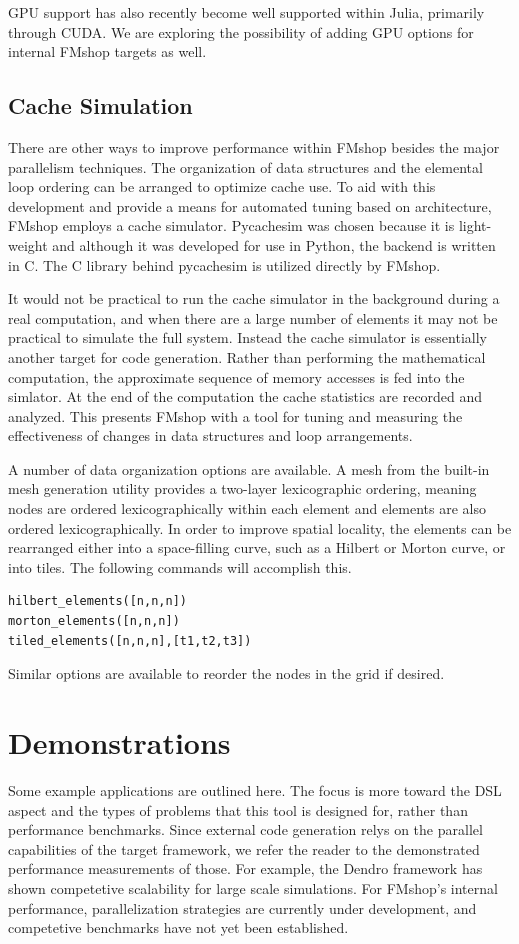 \documentclass[twoside,leqno,twocolumn]{article}
\begin{document}
GPU support has also recently become well supported within Julia\cite{juliagpu}, primarily through CUDA. We are exploring the possibility of adding GPU options for internal FMshop targets as well.

\subsection{Cache Simulation}
There are other ways to improve performance within FMshop besides the major parallelism techniques. The organization of data structures and the elemental loop ordering can be arranged to optimize cache use. To aid with this development and provide a means for automated tuning based on architecture, FMshop employs a cache simulator. Pycachesim\cite{pycachesim} was chosen because it is light-weight and although it was developed for use in Python, the backend is written in C. The C library behind pycachesim is utilized directly by FMshop. 

It would not be practical to run the cache simulator in the background during a real computation, and when there are a large number of elements it may not be practical to simulate the full system. Instead the cache simulator is essentially another target for code generation. Rather than performing the mathematical computation, the approximate sequence of memory accesses is fed into the simlator. At the end of the computation the cache statistics are recorded and analyzed. This presents FMshop with a tool for tuning and measuring the effectiveness of changes in data structures and loop arrangements.

A number of data organization options are available. A mesh from the built-in mesh generation utility provides a two-layer lexicographic ordering, meaning nodes are ordered lexicographically within each element and elements are also ordered lexicographically. In order to improve spatial locality, the elements can be rearranged either into a space-filling curve, such as a Hilbert or Morton curve, or into tiles. The following commands will accomplish this.
\begin{verbatim}
hilbert_elements([n,n,n])
morton_elements([n,n,n])
tiled_elements([n,n,n],[t1,t2,t3])
\end{verbatim}

Similar options are available to reorder the nodes in the grid if desired.

\section{Demonstrations}
Some example applications are outlined here. The focus is more toward the DSL aspect and the types of problems that this tool is designed for, rather than performance benchmarks. Since external code generation relys on the parallel capabilities of the target framework, we refer the reader to the demonstrated performance measurements of those. For example, the Dendro framework has shown competetive scalability for large scale simulations\cite{dendro}\cite{dendro2}. For FMshop's internal performance, parallelization strategies are currently under development, and competetive benchmarks have not yet been established.
\end{document}
